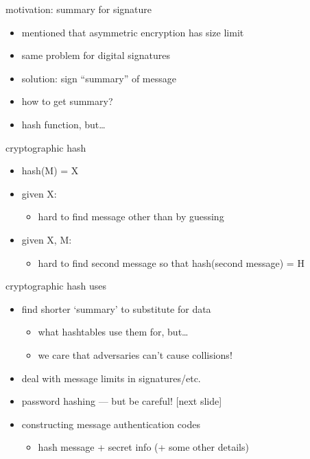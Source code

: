 \begin{frame}{motivation: summary for signature}
    \begin{itemize}
    \item mentioned that asymmetric encryption has size limit
    \item same problem for digital signatures
        \vspace{.5cm}
    \item solution: sign ``summary'' of message
    \item how to get summary?
    \item hash function, but\ldots
    \end{itemize}
\end{frame}

\begin{frame}{cryptographic hash}
    \begin{itemize}
    \item hash(M) = X
    \vspace{.5cm}
    \item given X:
        \begin{itemize}
        \item hard to find message other than by guessing
        \end{itemize}
    \item given X, M:
        \begin{itemize}
        \item hard to find second message so that hash(second message) = H
        \end{itemize}
    \end{itemize}
\end{frame}

\begin{frame}{cryptographic hash uses}
    \begin{itemize}
    \item find shorter `summary' to substitute for data
        \begin{itemize}
        \item what hashtables use them for, but\ldots
        \item we care that adversaries can't cause collisions!
        \end{itemize}
    \vspace{.5cm}
    \item<2-> deal with message limits in signatures/etc.
    \item<2-> password hashing --- but be careful! [next slide]
    \item<2-> constructing message authentication codes
        \begin{itemize}
        \item hash message + secret info (+ some other details)
        \end{itemize}
    \end{itemize}
\end{frame}


